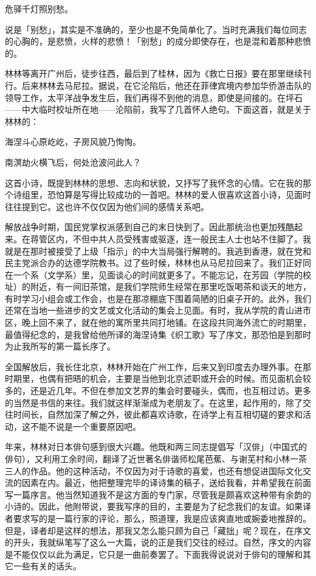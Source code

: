 {\begin{center}
      危驿千灯照别愁。
  \end{center}

  说是「别愁」，其实是不准确的，至少也是不免简单化了。当时充满我们每位同志的心胸的，是悲愤，火样的悲愤！「别愁」的成分即使存在，也是混和着那种悲愤的。

  林林等离开广州后，徒步往西，最后到了桂林，因为《救亡日报》要在那里继续刊行。后来林林去马尼拉。据说，在它沦陷后，他还在菲律宾境内参加华侨游击队的领导工作，太平洋战争发生后，我们再得不到他的消息，即使是间接的。在坪石——中大临时校址所在地——沦陷前，我写了几首怀人绝句。下面这首，就是关于林林的：
  \begin{center}
      海涅斗心原屹屹，子房风貌乃恂恂。

      南溟劫火横飞后，何处沧波问此人？
  \end{center}

  这首小诗，既提到林林的思想、志向和状貌，又抒写了我怀念的心情。它在我的那个诗组里，恐怕算是写得比较成功的一首吧。林林的爱人很喜欢这首小诗，见面时往往提到它。这也许不仅仅因为他们间的感情关系吧。

  解放战争时期，国民党掌权派感到自己的末日快到了。因此那统治也更加残酷起来。在蒋管区内，不但中共人员受残害或驱逐，连一般民主人士也站不住脚了。我就是在那时被接受了上级「指示」的中大当局强行解聘的。我逃到香港，就在党和民主党派合办的达德学院教书。过了些时候，林林也从马尼拉回来了。我们正好同在一个系（文学系）里，见面谈心的时间就更多了。不能忘记，在芳园（学院的校址）的附近，有一间旧茶馆，是我们学院师生经常在那里吃饭喝茶和谈天的地方，有时学习小组会或工作会，也是在那凉棚底下围着简陋的旧桌子开的。此外，我们还常在当地一些进步的文艺或文化活动的集会上见面。有时，我从学院的青山进市区，晚上回不来了，就在他的寓所里共同打地铺。在这段共同海外流亡的时期里，最值得纪念的，是我曾给他所译的海涅诗集《织工歌》写了序文，那恐怕是到那时为止我所写的第一篇长序了。

  全国解放后，我长住北京，林林开始在广州工作，后来又到印度去办理外事。在那时期里，也偶有把晤的机会，主要是当他到北京述职或开会的时候。而见面机会较多的，还是近几年。不但在参加文艺界的集会时要碰头，偶而，也互相过访。更多的当然是书信的来往。我们就这样渐渐成为老朋友了。在这里，起作用的，除了交往时间长，自然加深了解之外，彼此都喜欢诗歌，在诗学上有互相切磋的要求和活动，这不能不说是一个重要原因吧。

  年来，林林对日本俳句感到很大兴趣。他既和两三同志提倡写「汉俳」（中国式的俳句），又利用工余时间，翻译了近世著名俳谐师松尾芭蕉、与谢芜村和小林一茶三人的作品。他的这种活动，不仅因为对于诗歌的喜爱，也还有想促进国际文化交流的因素在内。最近，他把整理完毕的译诗集的稿子，送给我看，并希望我在前面写一篇序言。他当然知道我不是这方面的专门家，尽管我是颇喜欢这种带有余韵的小诗的。因此，他附带说，要我写序的目的，主要是为了纪念我们的友谊。如果译者要求写的是一篇行家的评论，那么，照道理，我是应该爽直地或婉委地推辞的。但是，译者却是这样的想法，那我又怎么能只顾为自己「藏拙」呢？现在，在序文的开头，我就纵笔写了这么一大篇，说的正是我们交往的经过。自然，序文的内容是不能仅仅以此为满足，它只是一曲前奏罢了。下面我得说说对于俳句的理解和其它一些有关的话头。

}

